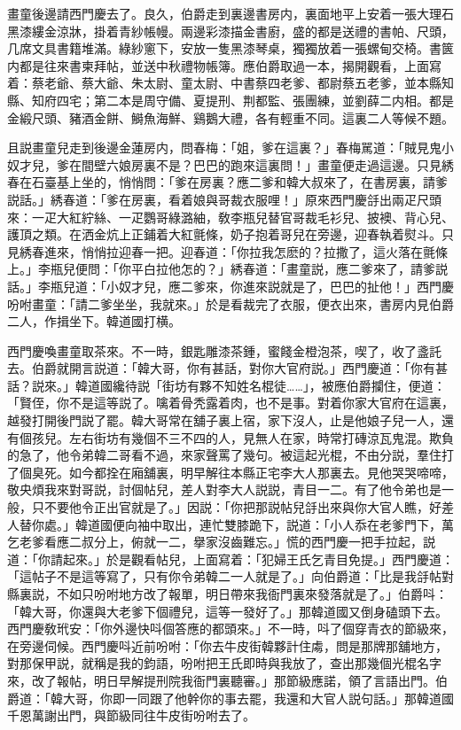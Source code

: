 畫童後邊請西門慶去了。良久，伯爵走到裏邊書房内，裏面地平上安着一張大理石黑漆縷金涼牀，掛着青紗帳幔。兩邊彩漆描金書廚，盛的都是送禮的書帕、尺頭，几席文具書籍堆滿。綠紗窻下，安放一隻黑漆琴桌，獨獨放着一張螺甸交椅。書篋内都是往來書柬拜帖，並送中秋禮物帳簿。應伯爵取過一本，揭開觀看，上面寫着：蔡老爺、蔡大爺、朱太尉、童太尉、中書蔡四老爹、都尉蔡五老爹，並本縣知縣、知府四宅；第二本是周守備、夏提刑、荆都監、張團練，並劉薛二内相。都是金緞尺頭、豬酒金餅、鰣魚海鮮、鷄鵝大禮，各有輕重不同。這裏二人等候不題。

且説畫童兒走到後邊金蓮房内，問春梅：「姐，爹在這裏？」春梅駡道：「賊見鬼小奴才兒，爹在間壁六娘房裏不是？巴巴的跑來這裏問！」畫童便走過這邊。只見綉春在石臺基上坐的，悄悄問：「爹在房裏？應二爹和韓大叔來了，在書房裏，請爹説話。」綉春道：「爹在房裏，看着娘與哥裁衣服哩！」原來西門慶㧱出兩疋尺頭來：一疋大紅紵絲、一疋鸚哥綠潞紬，敎李瓶兒替官哥裁毛衫兒、披襖、背心兒、護頂之類。在洒金炕上正鋪着大紅氈條，奶子抱着哥兒在旁邊，迎春執着熨斗。只見綉春進來，悄悄拉迎春一把。迎春道：「你拉我怎麽的？拉撒了，這火落在氈條上。」李瓶兒便問：「你平白拉他怎的？」綉春道：「畫童説，應二爹來了，請爹説話。」李瓶兒道：「小奴才兒，應二爹來，你進來説就是了，巴巴的扯他！」西門慶吩咐畫童：「請二爹坐坐，我就來。」於是看裁完了衣服，便衣出來，書房内見伯爵二人，作揖坐下。韓道國打横。

西門慶喚畫童取茶來。不一時，銀匙雕漆茶鍾，蜜餞金橙泡茶，喫了，收了盞託去。伯爵就開言説道：「韓大哥，你有甚話，對你大官府説。」西門慶道：「你有甚話？説來。」韓道國纔待説「街坊有夥不知姓名棍徒……」，被應伯爵攔住，便道：「賢侄，你不是這等説了。噙着骨秃露着肉，也不是事。對着你家大官府在這裏，越發打開後門説了罷。韓大哥常在舖子裏上宿，家下沒人，止是他娘子兒一人，還有個孩兒。左右街坊有幾個不三不四的人，見無人在家，時常打磚涼瓦鬼混。欺負的急了，他令弟韓二哥看不過，來家聲罵了幾句。被這起光棍，不由分説，羣住打了個臭死。如今都拴在廂舖裏，明早解往本縣正宅李大人那裏去。見他哭哭啼啼，敬央煩我來對哥説，討個帖兒，差人對李大人説説，青目一二。有了他令弟也是一般，只不要他令正出官就是了。」因説：「你把那説帖兒㧱出來與你大官人瞧，好差人替你處。」韓道國便向袖中取出，連忙雙膝跪下，説道：「小人忝在老爹門下，萬乞老爹看應二叔分上，俯就一二，擧家沒齒難忘。」慌的西門慶一把手拉起，説道：「你請起來。」於是觀看帖兒，上面寫着：「犯婦王氏乞青目免提。」西門慶道：「這帖子不是這等寫了，只有你令弟韓二一人就是了。」向伯爵道：「比是我㧱帖對縣裏説，不如只吩咐地方改了報單，明日帶來我衙門裏來發落就是了。」伯爵呌：「韓大哥，你還與大老爹下個禮兒，這等一發好了。」那韓道國又倒身磕頭下去。西門慶敎玳安：「你外邊快呌個答應的都頭來。」不一時，呌了個穿青衣的節級來，在旁邊伺候。西門慶呌近前吩咐：「你去牛皮街韓夥計住䖏，問是那牌那舖地方，對那保甲説，就稱是我的鈞語，吩咐把王氏即時與我放了，查出那幾個光棍名字來，改了報帖，明日早解提刑院我衙門裏聽審。」那節級應諾，領了言語出門。伯爵道：「韓大哥，你即一同跟了他幹你的事去罷，我還和大官人説句話。」那韓道國千恩萬謝出門，與節級同往牛皮街吩咐去了。

